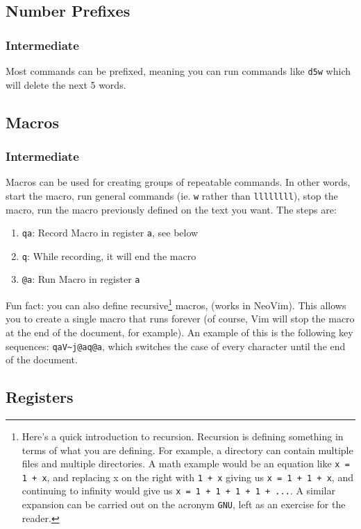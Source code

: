 \documentclass[11pt]{article}
\begin{document}
\subsection{Number Prefixes}
\label{sec:orgbc18d83}
\subsubsection{Intermediate}
\label{sec:orgf38112f}
Most commands can be prefixed, meaning you can run commands like \texttt{d5w} which
will delete the next 5 words.
\subsection{Macros}
\label{sec:org651b199}
\subsubsection{Intermediate}
\label{sec:orgd86a787}
Macros can be used for creating groups of repeatable commands. In other words,
start the macro, run general commands (ie. \texttt{w} rather than \texttt{llllllll}), stop the
macro, run the macro previously defined on the text you want. The steps are:

\begin{enumerate}
\item \texttt{qa}: Record Macro in register \texttt{a}, see below
\item \texttt{q}: While recording, it will end the macro
\item \texttt{@a}: Run Macro in register \texttt{a}
\end{enumerate}

Fun fact: you can also define recursive\footnote{Here's a quick introduction to recursion. Recursion is defining 
something in terms of what you are defining. For example, a directory 
can contain multiple files and multiple directories. A math example 
would be an equation like \texttt{x = 1 + x}, and replacing x on the right with
\texttt{1 + x} giving us \texttt{x = 1 + 1 + x}, and continuing to infinity would give
us \texttt{x = 1 + 1 + 1 + 1 + ...}. A similar expansion can be carried out 
on the acronym \texttt{GNU}, left as an exercise for the reader.} macros, (works in NeoVim). This
allows you to create a single macro that runs forever (of course, Vim will stop
the macro at the end of the document, for example). An example of this is the
following key sequences: \texttt{qaV\textasciitilde{}j@aq@a}, which switches the case of every
character until the end of the document.
\subsection{Registers}
\label{sec:org125c174}
\end{document}
